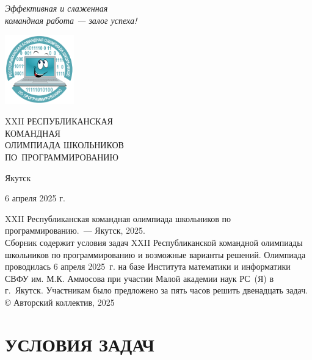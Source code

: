 \documentclass[a5paper, twoside, 11pt]{article}
\begin{document}
\pagestyle{empty}

\begin{flushright} \it
  Эффективная и слаженная \\
  командная работа --- залог успеха!
\end{flushright}
\vskip -15mm
\includegraphics[width=3cm,height=3cm]{figures/logo.pdf}
\\[3cm]
\begin{center}
\huge
XXII РЕСПУБЛИКАНСКАЯ\\КОМАНДНАЯ\\ОЛИМПИАДА ШКОЛЬНИКОВ\\
ПО~ПРОГРАММИРОВАНИЮ
\end{center}
\vfill
\centerline{Якутск}
\centerline{6 апреля 2025 г.}

\newpage
\noindent XXII Республиканская командная олимпиада школьников по программированию.~--- Якутск, 2025.
\\[5mm]
Сборник содержит условия задач XXII Республиканской командной олимпиады школьников по программированию и возможные варианты решений. Олимпиада проводилась 6 апреля 2025~г. на базе Института математики и информатики СВФУ им. М.К. Аммосова при участии Малой академии наук РС~(Я) в г.~Якутск. Участникам было предложено за пять часов решить двенадцать задач.
\vfill
\hfill © Авторский коллектив, 2025







\pagestyle{fancy}

\newpage
\rm
\thispagestyle{plain}
\section*{УСЛОВИЯ ЗАДАЧ}

\newcommand{\importproblem}[1]{
  \graphicspath{{problems/#1/statements/russian/}} %
  {problem.tex} %
}

\end{document}
